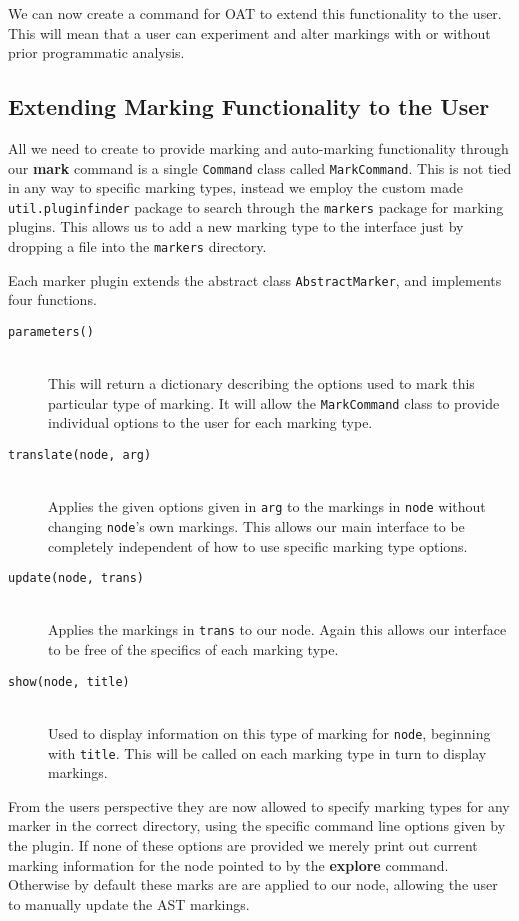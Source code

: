 \documentclass[twoside,a4paper]{report}
\begin{document}
We can now create a command for OAT to extend this functionality to the user. This will mean that a user can experiment and alter markings
with or without prior programmatic analysis.

\subsection{Extending Marking Functionality to the User}

All we need to create to provide marking and auto-marking functionality through our \textbf{mark} command is a single \texttt{Command}
class called \texttt{MarkCommand}. This is not tied in any way to specific marking types, instead we employ the custom made
\texttt{util.pluginfinder} package to search through the \texttt{markers} package for marking plugins. This allows us to add a new
marking type to the interface just by dropping a file into the \texttt{markers} directory.

Each marker plugin extends the abstract class \texttt{AbstractMarker}, and implements four functions.

\begin{description}
\item[\texttt{parameters()}] \hfill \\
This will return a dictionary describing the options used to mark this particular type of marking. It will allow the \texttt{MarkCommand}
class to provide individual options to the user for each marking type.
\item[\texttt{translate(node, arg)}] \hfill \\
Applies the given options given in \texttt{arg} to the markings in \texttt{node} without changing \texttt{node}'s own markings. This allows
our main interface to be completely independent of how to use specific marking type options.
\item[\texttt{update(node, trans)}] \hfill \\
Applies the markings in \texttt{trans} to our node. Again this allows our interface to be free of the specifics of each marking type.
\item[\texttt{show(node, title)}] \hfill \\
Used to display information on this type of marking for \texttt{node}, beginning with \texttt{title}. This will be called on each marking
type in turn to display markings.
\end{description}

From the users perspective they are now allowed to specify marking types for any marker in the correct directory, using the specific command
line options given by the plugin. If none of these options are provided we merely print out current marking information for the node pointed to
by the \textbf{explore} command. Otherwise by default these marks are are applied to our node, allowing the user to manually update the AST
markings.
\end{document}
